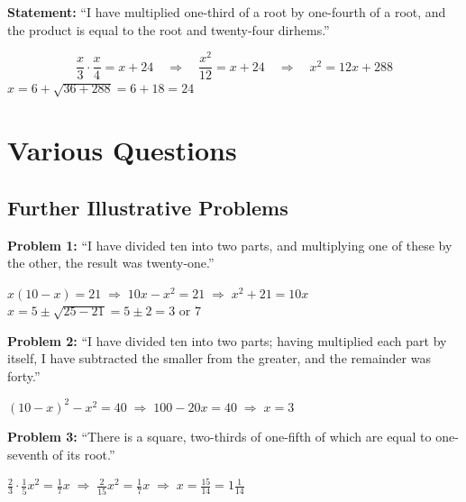 \documentclass[11pt,a4paper,openany,oneside]{book}
\begin{document}
\textbf{Statement:} ``I have multiplied one-third of a root by one-fourth of
a root, and the product is equal to the root and twenty-four dirhems.''

\begin{mathbox}
\begin{equation}
\frac{x}{3} \cdot \frac{x}{4} = x + 24 \quad\Rightarrow\quad \frac{x^2}{12} = x + 24
\quad\Rightarrow\quad x^2 = 12x + 288
\end{equation}
$x = 6 + \sqrt{36 + 288} = 6 + 18 = 24$
\end{mathbox}

\newpage

\chapter{Various Questions}
\label{ch:various}

\section*{Further Illustrative Problems}

\textbf{Problem 1:} ``I have divided ten into two parts, and multiplying one
of these by the other, the result was twenty-one.''

\begin{mathbox}
$x(10-x) = 21 \;\Rightarrow\; 10x - x^2 = 21 \;\Rightarrow\; x^2 + 21 = 10x$
$x = 5 \pm \sqrt{25 - 21} = 5 \pm 2 = 3 \text{ or } 7$
\end{mathbox}

\textbf{Problem 2:} ``I have divided ten into two parts; having multiplied
each part by itself, I have subtracted the smaller from the greater, and the
remainder was forty.''

\begin{mathbox}
$(10-x)^2 - x^2 = 40 \;\Rightarrow\; 100 - 20x = 40 \;\Rightarrow\; x = 3$
\end{mathbox}

\textbf{Problem 3:} ``There is a square, two-thirds of one-fifth of which are
equal to one-seventh of its root.''

\begin{mathbox}
$\tfrac{2}{3} \cdot \tfrac{1}{5} x^2 = \tfrac{1}{7}x \;\Rightarrow\; \tfrac{2}{15}x^2 = \tfrac{1}{7}x
\;\Rightarrow\; x = \tfrac{15}{14} = 1\tfrac{1}{14}$
\end{mathbox}
\end{document}
